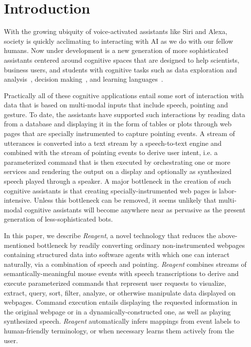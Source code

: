 \section{Introduction}

With the growing ubiquity of voice-activated assistants like Siri and Alexa, society is
quickly acclimating to interacting with AI as we do with our fellow humans. Now under development is
a new generation of more sophisticated assistants centered around 
cognitive spaces that are designed to help scientists, business users, and students with
cognitive tasks such as data exploration and analysis~\cite{kephart2018cognitive}, decision making~\cite{farrell2016symbiotic}, and learning languages~\cite{allen_rensselaer_2019}.

Practically all of these cognitive applications entail some sort of interaction with data that
is based on multi-modal inputs that include speech, pointing and gesture. To date, the assistants have 
supported such interactions by reading data from a database and displaying it in the form of tables or 
plots through web pages that are specially instrumented to capture pointing events. A stream of utterances 
is converted into a text stream by a speech-to-text engine and combined with the stream of pointing events 
to derive user intent, i.e. a parameterized command that is then executed by orchestrating one or more services 
and rendering the output on a display and optionally as synthesized speech played through a speaker. A 
major bottleneck in the creation of such cognitive assistants is that creating specially-instrumented web 
pages is labor-intensive. Unless this bottleneck can be removed, it seems unlikely that multi-modal cognitive
assistants will become anywhere near as pervasive as the present generation of less-sophisticated bots.

In this paper, we describe \textit{Reagent}, a novel technology that reduces the above-mentioned bottleneck by
readily converting ordinary non-instrumented webpages containing structured data into
software agents with which one can interact naturally, via a combination of speech and
pointing. \textit{Reagent} combines streams of semantically-meaningful mouse events with
speech transcriptions to derive and execute parameterized commands that represent user
requests to visualize, extract, query, sort, filter, analyze, or otherwise manipulate data
displayed on webpages. Command execution entails displaying the requested information in the
original webpage or in a dynamically-constructed one, as well as playing synthesized speech.
\textit{Reagent} automatically infers mappings from event labels to human-friendly terminology,
or when necessary learns them actively from the user. 


